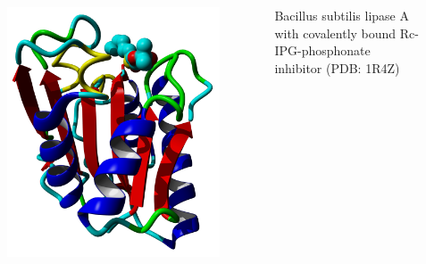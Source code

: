\documentclass[english]{beamer}
\begin{document}
\begin{frame}
\begin{columns}[t]
        \begin{figure}
            \includegraphics[width=.9\linewidth]{figures/Lipase.png}
        \end{figure}     
        \tiny Bacillus subtilis lipase A with covalently bound Rc-IPG-phosphonate inhibitor (PDB: 1R4Z)

    \end{columns} 

\end{frame}


%
%
%
%
\end{document}
